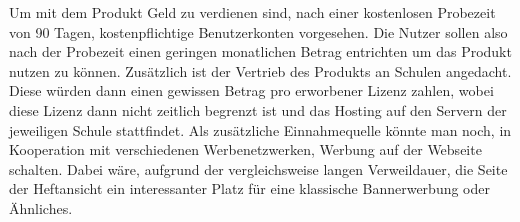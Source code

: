 \newpage

Um mit dem Produkt Geld zu verdienen sind, nach einer kostenlosen Probezeit von 90 Tagen, kostenpflichtige Benutzerkonten vorgesehen. Die Nutzer sollen also nach der Probezeit einen geringen monatlichen Betrag entrichten um das Produkt nutzen zu können. Zusätzlich ist der Vertrieb des Produkts an Schulen angedacht. Diese würden dann einen gewissen Betrag pro erworbener Lizenz zahlen, wobei diese Lizenz dann nicht zeitlich begrenzt ist und das Hosting auf den Servern der jeweiligen Schule stattfindet. Als zusätzliche Einnahmequelle könnte man noch, in Kooperation mit verschiedenen Werbenetzwerken, Werbung auf der Webseite schalten. Dabei wäre, aufgrund der vergleichsweise langen Verweildauer, die Seite der Heftansicht ein interessanter Platz für eine klassische Bannerwerbung oder Ähnliches.
